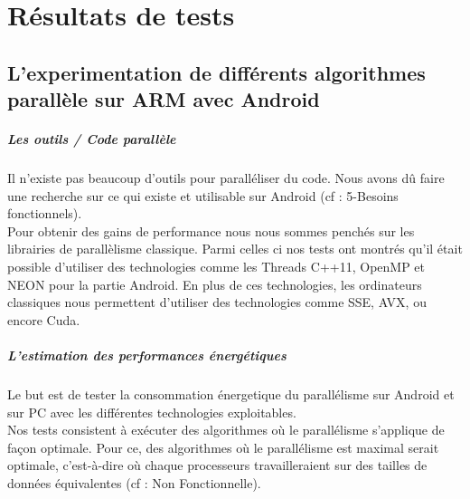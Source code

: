 \chapter{Résultats de tests}

\section{ L'experimentation de différents algorithmes parallèle sur ARM avec Android }

\paragraph{Les outils / Code parallèle \\}

	Il n'existe pas beaucoup d'outils pour paralléliser du code. Nous avons dû faire une recherche sur ce qui existe et utilisable sur Android (cf : 5-Besoins fonctionnels). \\

	Pour obtenir des gains de performance nous nous sommes penchés sur les librairies de parallèlisme classique. Parmi celles ci nos tests ont montrés qu'il était possible d'utiliser des technologies comme les Threads C++11, OpenMP et NEON pour la partie Android. En plus de ces technologies, les ordinateurs classiques nous permettent d'utiliser des technologies comme SSE, AVX, ou encore Cuda.\\

\paragraph{L'estimation des performances énergétiques \\}

	Le but est de tester la consommation énergetique du parallélisme sur Android et sur PC avec les différentes technologies exploitables. \\

	Nos tests consistent à exécuter des algorithmes où le parallélisme s'applique de façon optimale. Pour ce, des algorithmes où le parallélisme est maximal serait optimale, c'est-à-dire où chaque processeurs travailleraient sur des tailles de données équivalentes (cf : Non Fonctionnelle).
